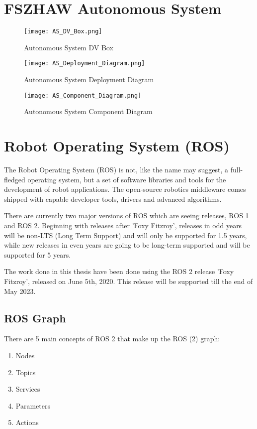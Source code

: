 \section{FSZHAW Autonomous System}
\begin{figure}[H]
    \centering
    \texttt{[image: AS\_DV\_Box.png]}
    \caption{Autonomous System DV Box}
    \label{fig:AS DV Box}
\end{figure}

\begin{figure}[H]
    \centering
    \texttt{[image: AS\_Deployment\_Diagram.png]}
    \caption{Autonomous System Deployment Diagram}
    \label{fig:AS Deployment Diagram}
\end{figure}

\begin{figure}[H]
    \centering
    \texttt{[image: AS\_Component\_Diagram.png]}
    \caption{Autonomous System Component Diagram}
    \label{fig:AS Component Diagram}
\end{figure}

\section{Robot Operating System (ROS)}
The Robot Operating System (ROS) is not, like the name may suggest, a full-fledged operating system, but a set of software libraries and tools for the development of robot applications. The open-source robotics middleware comes shipped with capable developer tools, drivers and advanced algorithms. \cite{ros2_documentation}

There are currently two major versions of ROS which are seeing releases, ROS 1 and ROS 2. \cite{ros2_distributions} Beginning with releases after 'Foxy Fitzroy', releases in odd years will be non-LTS (Long Term Support) and will only be supported for 1.5 years, while new releases in even years are going to be long-term supported and will be supported for 5 years. \cite{ros2_releases_and_target_platforms}

The work done in this thesis have been done using the ROS 2 release 'Foxy Fitzroy', released on June 5th, 2020. This release will be supported till the end of May 2023. \cite{ros2_distributions}

\subsection{ROS Graph}
There are 5 main concepts of ROS 2 that make up the ROS (2) graph:
\begin{enumerate}
    \item Nodes
    \item Topics
    \item Services
    \item Parameters
    \item Actions
\end{enumerate}

